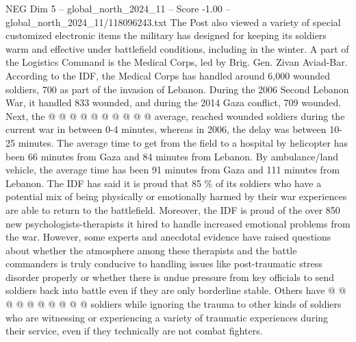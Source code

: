 \begin{textsample}{NEG Dim 5 – global\_north\_2024\_11 – Score -1.00 – global\_north\_2024\_11/118096243.txt}
The Post also viewed a variety of special customized electronic items the military has designed for keeping its soldiers warm and effective under battlefield conditions, including in the winter.
A part of the Logistics Command is the Medical Corps, led by Brig.
Gen.
Zivan Aviad-Bar.
According to the IDF, the Medical Corps has handled around 6,000 wounded soldiers, 700 as part of the invasion of Lebanon.
During the 2006 Second Lebanon War, it handled 833 wounded, and during the 2014 Gaza conflict, 709 wounded.
Next, the @ @ @ @ @ @ @ @ @ @ average, reached wounded soldiers during the current war in between 0-4 minutes, whereas in 2006, the delay was between 10-25 minutes.
The average time to get from the field to a hospital by helicopter has been 66 minutes from Gaza and 84 minutes from Lebanon.
By ambulance/land vehicle, the average time has been 91 minutes from Gaza and 111 minutes from Lebanon.
The IDF has said it is proud that 85 \% of its soldiers who have a potential mix of being physically or emotionally harmed by their war experiences are able to return to the battlefield.
Moreover, the IDF is proud of the over 850 new psychologists-therapists it hired to handle increased emotional problems from the war.
However, some experts and anecdotal evidence have raised questions about whether the atmosphere among these therapists and the battle commanders is truly conducive to handling issues like post-traumatic stress disorder properly or whether there is undue pressure from key officials to send soldiers back into battle even if they are only borderline stable.
Others have @ @ @ @ @ @ @ @ @ @ soldiers while ignoring the trauma to other kinds of soldiers who are witnessing or experiencing a variety of traumatic experiences during their service, even if they technically are not combat fighters.

\end{textsample}
